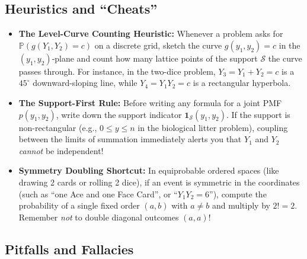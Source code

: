 \documentclass[11pt, letterpaper]{article}
\theoremstyle{definition}
\theoremstyle{remark}
\newcommand{\Prob}{\mathbb{P}}
\begin{document}
\subsection{Heuristics and ``Cheats''}

\begin{itemize}
    \item \textbf{The Level-Curve Counting Heuristic:} Whenever a problem asks for $\Prob(g(Y_1, Y_2) = c)$ on a discrete grid, sketch the curve $g(y_1, y_2) = c$ in the $(y_1, y_2)$-plane and count how many lattice points of the support $\mathcal{S}$ the curve passes through. For instance, in the two-dice problem, $Y_3 = Y_1 + Y_2 = c$ is a $45^\circ$ downward-sloping line, while $Y_4 = Y_1 Y_2 = c$ is a rectangular hyperbola.
    \item \textbf{The Support-First Rule:} Before writing any formula for a joint PMF $p(y_1, y_2)$, write down the support indicator $\mathbf{1}_{\mathcal{S}}(y_1, y_2)$. If the support is non-rectangular (e.g., $0 \le y \le n$ in the biological litter problem), coupling between the limits of summation immediately alerts you that $Y_1$ and $Y_2$ \emph{cannot} be independent!
    \item \textbf{Symmetry Doubling Shortcut:} In equiprobable ordered spaces (like drawing 2 cards or rolling 2 dice), if an event is symmetric in the coordinates (such as ``one Ace and one Face Card'', or ``$Y_1 Y_2 = 6$''), compute the probability of a single fixed order $(a, b)$ with $a \neq b$ and multiply by $2! = 2$. Remember \emph{not} to double diagonal outcomes $(a, a)$!
\end{itemize}

\subsection{Pitfalls and Fallacies}
\end{document}
